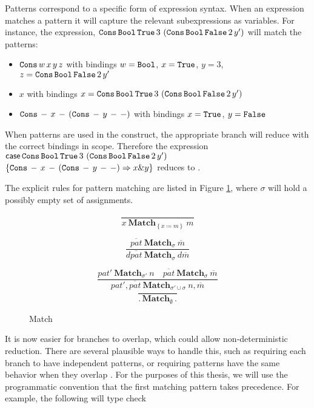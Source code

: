Patterns correspond to a specific form of expression syntax.
When an expression matches a pattern it will capture the relevant subexpressions as variables.
For instance, the expression,
  $\mathtt{Cons}{}\,\mathtt{Bool}{}\,\mathtt{True}{}\,3\,\left(\mathtt{Cons}{}\,\mathtt{Bool}{}\,\mathtt{False}{}\,2\,y'\right)$
  will match the patterns:
\begin{itemize}
\item $\mathtt{Cons}{}\,w\,x\,y\,z$ with bindings $w=\mathtt{Bool}{}$, $x=\mathtt{True}{}$, $y=3$, $z=\mathtt{Cons}{}\,\mathtt{Bool}{}\,\mathtt{False}{}\,2\,y'$
\item $x$ with bindings $x = \mathtt{Cons}{}\,\mathtt{Bool}{}\,\mathtt{True}{}\,3\,\left(\mathtt{Cons}{}\,\mathtt{Bool}{}\,\mathtt{False}{}\,2\,y'\right)$
\item $\mathtt{Cons}{}\,-\,x\,-\,\left(\mathtt{Cons}{}\,-\,y\,-\,-\right)$ with bindings $x = \mathtt{True}{}$, $y = \mathtt{False}{}$
\end{itemize}
When patterns are used in the \case{} construct, the appropriate branch will reduce with the correct bindings in scope.
Therefore the expression 
  $\mathsf{case}{}\,\mathtt{Cons}{}\,\mathtt{Bool}{}\,\mathtt{True}{}\,3\,\left(\mathtt{Cons}{}\,\mathtt{Bool}{}\,\mathtt{False}{}\,2\,y'\right)$ $\left\{ \mathtt{Cons}{}\,-\,x\,-\,\left(\mathtt{Cons}{}\,-\,y\,-\,-\right)\Rightarrow x\&y\right\} $
  reduces to \False{}.

The explicit rules for pattern matching are listed in Figure \ref{fig:surface-data-match}, where $\sigma$ will hold a possibly empty set of assignments.

\begin{figure}
\[
\frac{\,}{x\ \mathbf{Match}_{\left\{ x\coloneqq m\right\} }\ m}
\]

\[
\frac{\overline{pat}\ \mathbf{Match}_{\sigma}\ \overline{m}}{d\overline{pat}\ \mathbf{Match}_{\sigma}\ d\overline{m}}
\]

\[
\frac{pat'\ \mathbf{Match}_{\sigma'}\ n\quad\overline{pat}\ \mathbf{Match}_{\sigma}\ \overline{m}}{pat',\overline{pat}\ \mathbf{Match}_{\sigma'\cup\sigma}\ n,\overline{m}}
\]
\[
\frac{\,}{.\,\mathbf{Match}_{\emptyset}\,.}
\]

\caption{\SLang{} Match}
\label{fig:surface-data-match}
\end{figure}

It is now easier for \case{} branches to overlap, which could allow non-deterministic reduction.
There are several plausible ways to handle this, such as requiring each branch to have independent patterns, or requiring patterns have the same behavior when they overlap \cite{10.1007/978-3-642-54833-8_6}.
For the purposes of this thesis, we will use the programmatic convention that the first matching pattern takes precedence.
For example, the following will type check

